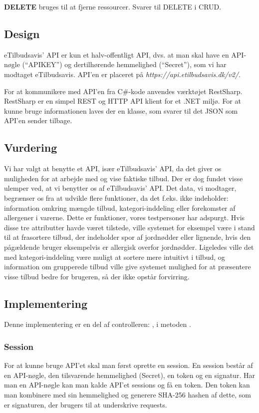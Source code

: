 \textbf{DELETE}
bruges til at fjerne ressourcer.
Svarer til DELETE i CRUD.

\subsection{Design}
eTilbudsavis' API er kun et halv-offentligt API, dvs. at man skal have en API-nøgle (``APIKEY'') og dertilhørende hemmelighed (``Secret''), som vi har modtaget eTilbudsavis.
API'en er placeret på \textit{https://api.etilbudsavis.dk/v2/}. \citep{eTilAPI}

For at kommunikere med API'en fra C\#-kode anvendes værktøjet RestSharp. 
RestSharp er en simpel REST og HTTP API klient for et .NET miljø. \citep{RestSharp}
For at kunne bruge informationen laves der en klasse, som svarer til det JSON som API'en sender tilbage.

\subsection{Vurdering}\label{api:skoddata}
Vi har valgt at benytte et API, især eTilbudsavis' API, da det giver os muligheden for at arbejde med og vise faktiske tilbud.
Der er dog fundet visse ulemper ved, at vi benytter os af eTilbudsavis' API.
Det data, vi modtager, begrænser os fra at udvikle flere funktioner, da det f.eks. ikke indeholder: information omkring mængde tilbud, kategori-inddeling eller forekomster af allergener i varerne. 
Dette er funktioner, vores testpersoner har adspurgt. 
Hvis disse tre attributter havde været tilstede, ville systemet for eksempel være i stand til at frasortere tilbud, der indeholder spor af jordnødder eller lignende, hvis den pågældende bruger eksempelvis er allergisk overfor jordnødder. 
Ligeledes ville det med kategori-inddeling være muligt at sortere mere intuitivt i tilbud, og information om grupperede tilbud ville give systemet mulighed for at præsentere visse tilbud bedre for brugeren, så der ikke opstår forvirring.

\subsection{Implementering}
Denne implementering er en del af controlleren: , i metoden .
\subsubsection{Session}
For at kunne bruge API'et skal man først oprette en session.
En session består af en API-nøgle, den tilsvarende hemmelighed (Secret), en token og en signatur.
Har man en API-nøgle kan man kalde API'et sessions og få en token.
Den token kan man kombinere med sin hemmelighed og generere SHA-256 hashen af dette, som er signaturen, der brugers til at underskrive requests.


